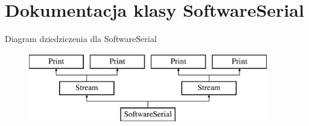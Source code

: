 \hypertarget{class_software_serial}{}\section{Dokumentacja klasy Software\+Serial}
\label{class_software_serial}
Diagram dziedziczenia dla Software\+Serial\begin{figure}[H]
\begin{center}
\leavevmode
\includegraphics[height=3.000000cm]{class_software_serial}
\end{center}
\end{figure}
